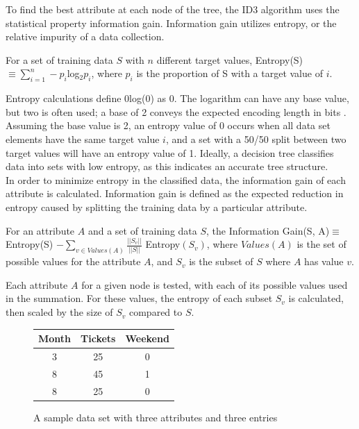 To find the best attribute at each node of the tree, the ID3 algorithm uses the statistical property information gain. Information gain utilizes entropy, or the relative impurity of a data collection.
\begin{define}
  For a set of training data $S$ with $n$ different target values, Entropy(S)$\equiv\sum_{i=1}^n-p_i$log$_2p_i$, where $p_i$ is the proportion of S with a target value of $i$.
\end{define}
Entropy calculations define 0log(0) as 0. The logarithm can have any base value, but two is often used; a base of 2 conveys the expected encoding length in bits \cite{mitc97}. Assuming the base value is 2, an entropy value of 0 occurs when all data set elements have the same target value $i$, and a  set with a 50/50 split between two target values will have an entropy value of 1. Ideally, a decision tree classifies data into sets with low entropy, as this indicates an accurate tree structure.\\

In order to minimize entropy in the classified data, the information gain of each attribute is calculated. Information gain is defined as the expected reduction in entropy caused by splitting the training data by a particular attribute.
\begin{define}
  For an attribute $A$ and a set of training data $S$, the Information Gain(S, A)$\equiv$ Entropy(S) $-\sum_{v\in Values(A)}\frac{||S_v||}{||S||}$ Entropy$(S_v)$, where $Values(A)$ is the set of possible values for the attribute $A$, and $S_v$ is the subset of $S$ where $A$ has value $v$.
\end{define}
Each attribute $A$ for a given node is tested, with each of its possible values used in the summation. For these values, the entropy of each subset $S_v$ is calculated, then scaled by the size of $S_v$ compared to $S$.\\

\begin{figure}[H]
  \centering
  \begin{tabular}{| c | c | c |}
    Month & Tickets & Weekend \\ \hline
    3 & 25 & 0 \\ \hline
    8 & 45 & 1 \\ \hline
    8 & 25 & 0 \\ \hline
  \end{tabular}
  \caption{A sample data set with three attributes and three entries}
  \label{fig:ExampleEntropy}
\end{figure}

